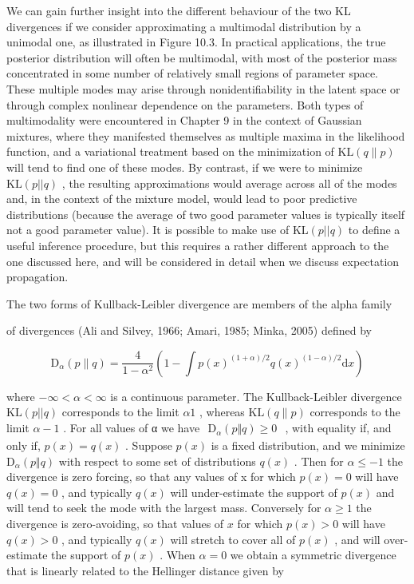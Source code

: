 \documentclass[
  10
]{article}
\begin{document}
We can gain further insight into the different behaviour of the two KL
divergences if we consider approximating a multimodal distribution by a
unimodal one, as illustrated in Figure 10.3. In practical applications,
the true posterior distribution will often be multimodal, with most of
the posterior mass concentrated in some number of relatively small
regions of parameter space. These multiple modes may arise through
nonidentifiability in the latent space or through complex nonlinear
dependence on the parameters. Both types of multimodality were
encountered in Chapter 9 in the context of Gaussian mixtures, where they
manifested themselves as multiple maxima in the likelihood function, and
a variational treatment based on the minimization of
\(\mathrm { K L } ( q \| p )\) will tend to find one of these modes. By
contrast, if we were to minimize \(\mathrm { K L } ( p | | q )\) , the
resulting approximations would average across all of the modes and, in
the context of the mixture model, would lead to poor predictive
distributions (because the average of two good parameter values is
typically itself not a good parameter value). It is possible to make use
of \(\mathrm { K L } ( p | | q )\) to define a useful inference
procedure, but this requires a rather different approach to the one
discussed here, and will be considered in detail when we discuss
expectation propagation.

The two forms of Kullback-Leibler divergence are members of the alpha
family

of divergences (Ali and Silvey, 1966; Amari, 1985; Minka, 2005) defined
by

\[
\mathrm{D} _ {\alpha} (p \| q) = \frac {4}{1 - \alpha^ {2}} \left(1 - \int p (x) ^ {(1 + \alpha) / 2} q (x) ^ {(1 - \alpha) / 2} \mathrm{d} x\right)\tag{10.19}
\]

where \(- \infty < \alpha < \infty\) is a continuous parameter. The
Kullback-Leibler divergence \(\mathrm { K L } ( p | | q )\) corresponds
to the limit \(\alpha  1\) , whereas \(\mathrm { K L } ( q \| p )\)
corresponds to the limit \(\alpha  - 1\) . For all values of α we have
\(\begin{array} { r } { \mathrm { D } _ { \alpha } ( p \Vert q ) \geqslant 0 } \end{array}\)
, with equality if, and only if, \(p ( x ) = q ( x )\) . Suppose
\(p ( x )\) is a fixed distribution, and we minimize
\(\mathrm { D } _ { \alpha } ( p \Vert q )\) with respect to some set of
distributions \(q ( x )\) . Then for \(\alpha \leqslant - 1\) the
divergence is zero forcing, so that any values of x for which
\(p ( x ) = 0\) will have \(q ( x ) = 0\) , and typically \(q ( x )\)
will under-estimate the support of \(p ( x )\) and will tend to seek the
mode with the largest mass. Conversely for \(\alpha \geqslant 1\) the
divergence is zero-avoiding, so that values of \(x\) for which
\(p ( x ) > 0\) will have \(q ( x ) > 0\) , and typically \(q ( x )\)
will stretch to cover all of \(p ( x )\) , and will over-estimate the
support of \(p ( x )\) . When \(\alpha = 0\) we obtain a symmetric
divergence that is linearly related to the Hellinger distance given by
\end{document}
